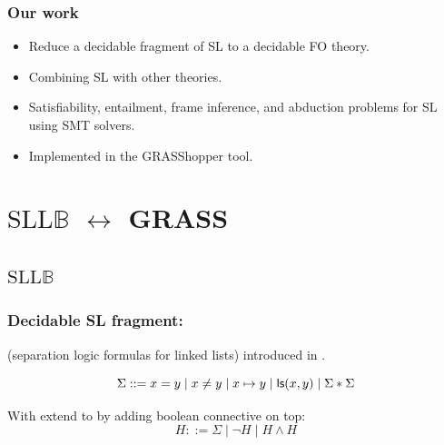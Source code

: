 \documentclass{beamer}
\begin{document}
\begin{frame}
  \frametitle{Our work}

  \begin{itemize}
  \item Reduce a decidable fragment of SL to a decidable FO theory.
  \item Combining SL with other theories.
  \item Satisfiability, entailment, frame inference, and abduction problems for SL using SMT solvers.
  \item Implemented in the GRASShopper tool.
  \end{itemize}

\end{frame}

\section{$\text{SLL}\mathbb{B}$ $\leftrightarrow$ GRASS}

\subsection{$\text{SLL}\mathbb{B}$}

\begin{frame}
  \frametitle{Decidable SL fragment: \JoshLogic}

\JoshLogicSimple (separation logic formulas for linked lists) introduced in \cite{BerdineETAL04DecidableFragmentSeparationLogic}.

\vspace{2ex}

\JoshLogicSimple
\begin{equation*}
  \Sigma ::= x = y \mid x \neq y \mid x \mapsto y \mid \mathsf{ls}({x},{y}) \mid \Sigma * \Sigma
\end{equation*}

\vspace{2ex}

With extend \JoshLogicSimple to \JoshLogic by adding boolean connective on top:
\begin{equation*}
  H ::= \Sigma \mid \neg H \mid H \land H
\end{equation*}

\end{frame}

\end{document}
